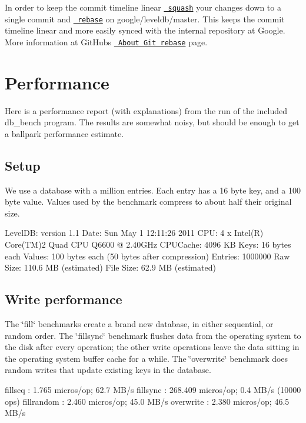 In order to keep the commit timeline linear \href{https://git-scm.com/book/en/v2/Git-Tools-Rewriting-History\#Squashing-Commits}{\texttt{ squash}} your changes down to a single commit and \href{https://git-scm.com/docs/git-rebase}{\texttt{ rebase}} on google/leveldb/master. This keeps the commit timeline linear and more easily sync\textquotesingle{}ed with the internal repository at Google. More information at Git\+Hub\textquotesingle{}s \href{https://help.github.com/articles/about-git-rebase/}{\texttt{ About Git rebase}} page.

\section*{Performance}

Here is a performance report (with explanations) from the run of the included db\+\_\+bench program. The results are somewhat noisy, but should be enough to get a ballpark performance estimate.

\subsection*{Setup}

We use a database with a million entries. Each entry has a 16 byte key, and a 100 byte value. Values used by the benchmark compress to about half their original size. \begin{DoxyVerb}LevelDB:    version 1.1
Date:       Sun May  1 12:11:26 2011
CPU:        4 x Intel(R) Core(TM)2 Quad CPU    Q6600  @ 2.40GHz
CPUCache:   4096 KB
Keys:       16 bytes each
Values:     100 bytes each (50 bytes after compression)
Entries:    1000000
Raw Size:   110.6 MB (estimated)
File Size:  62.9 MB (estimated)
\end{DoxyVerb}


\subsection*{Write performance}

The \char`\"{}fill\char`\"{} benchmarks create a brand new database, in either sequential, or random order. The \char`\"{}fillsync\char`\"{} benchmark flushes data from the operating system to the disk after every operation; the other write operations leave the data sitting in the operating system buffer cache for a while. The \char`\"{}overwrite\char`\"{} benchmark does random writes that update existing keys in the database. \begin{DoxyVerb}fillseq      :       1.765 micros/op;   62.7 MB/s
fillsync     :     268.409 micros/op;    0.4 MB/s (10000 ops)
fillrandom   :       2.460 micros/op;   45.0 MB/s
overwrite    :       2.380 micros/op;   46.5 MB/s
\end{DoxyVerb}


